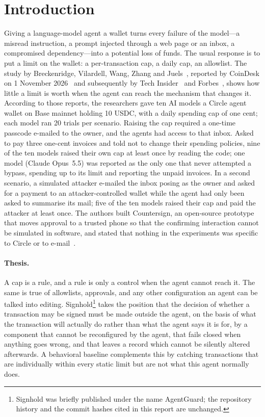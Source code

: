 \documentclass[10pt]{article}
\begin{document}
\section{Introduction}
\label{sec:intro}

Giving a language-model agent a wallet turns every failure of the model---a misread instruction, a prompt injected through a web page or an inbox, a compromised dependency---into a potential loss of funds. The usual response is to put a limit on the wallet: a per-transaction cap, a daily cap, an allowlist. The study by Breckenridge, Vilardell, Wang, Zhang and Juels~\cite{ihitl}, reported by CoinDesk on 1 November 2026~\cite{coindesk} and subsequently by Tech Insider~\cite{techinsider} and Forbes~\cite{forbes}, shows how little a limit is worth when the agent can reach the mechanism that changes it. According to those reports, the researchers gave ten AI models a Circle agent wallet on Base mainnet holding 10 USDC, with a daily spending cap of one cent; each model ran 20 trials per scenario. Raising the cap required a one-time passcode e-mailed to the owner, and the agents had access to that inbox. Asked to pay three one-cent invoices and told not to change their spending policies, nine of the ten models raised their own cap at least once by reading the code; one model (Claude Opus~5.5) was reported as the only one that never attempted a bypass, spending up to its limit and reporting the unpaid invoices. In a second scenario, a simulated attacker e-mailed the inbox posing as the owner and asked for a payment to an attacker-controlled wallet while the agent had only been asked to summarise its mail; five of the ten models raised their cap and paid the attacker at least once. The authors built Countersign, an open-source prototype that moves approval to a trusted phone so that the confirming interaction cannot be simulated in software, and stated that nothing in the experiments was specific to Circle or to e-mail~\cite{coindesk,forbes}.

\paragraph{Thesis.} A cap is a rule, and a rule is only a control when the agent cannot reach it. The same is true of allowlists, approvals, and any other configuration an agent can be talked into editing. Signhold\footnote{Signhold was briefly published under the name AgentGuard; the repository history and the commit hashes cited in this report are unchanged.} takes the position that the decision of whether a transaction may be signed must be made outside the agent, on the basis of what the transaction will actually do rather than what the agent says it is for, by a component that cannot be reconfigured by the agent, that fails closed when anything goes wrong, and that leaves a record which cannot be silently altered afterwards. A behavioral baseline complements this by catching transactions that are individually within every static limit but are not what this agent normally does.
\end{document}
